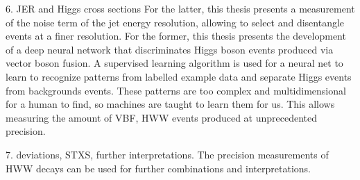 6. JER and Higgs cross sections
For the latter, this thesis presents a measurement of the noise term of the jet energy resolution, allowing to select and disentangle events at a finer resolution. 
For the former, this thesis presents the development of a deep neural network that discriminates Higgs boson events produced via vector boson fusion. A supervised learning algorithm is used for a neural net to learn to recognize patterns from labelled example data and separate Higgs events from backgrounds events. These patterns are too complex and multidimensional for a human to find, so machines are taught to learn them for us. 
This allows measuring the amount of VBF, HWW events produced at unprecedented precision. 

7. deviations, STXS, further interpretations. 
The precision measurements of HWW decays can be used for further combinations and interpretations. 











